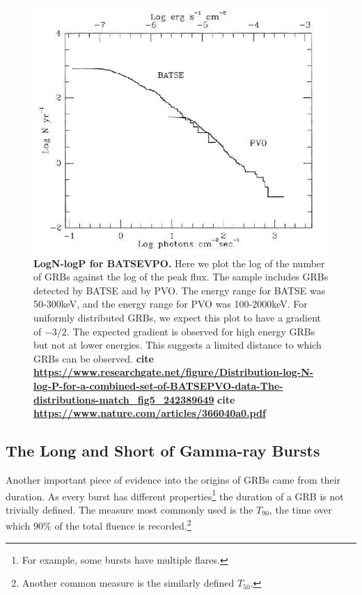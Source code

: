 \documentclass[11pt]{cuthesis}
\begin{document}
\begin{figure} %
\begin{center}
\includegraphics[width=0.8\linewidth]{logN-logP.png}
\end{center}
\caption{\textbf{LogN-logP for BATSEVPO.} Here we plot the log of the number of GRBs against the log of the peak flux. The sample includes GRBs detected by BATSE and by PVO. The energy range for BATSE was 50-300keV, and the energy range for PVO was 100-2000keV. For uniformly distributed GRBs, we expect this plot to have a gradient of $-3/2$. The expected gradient is observed for high energy GRBs but not at lower energies. This suggests a limited distance to which GRBs can be observed. 
\textbf{cite \url{https://www.researchgate.net/figure/Distribution-log-N-log-P-for-a-combined-set-of-BATSEPVO-data-The-distributions-match_fig5_242389649}}
\textbf{cite \url{https://www.nature.com/articles/366040a0.pdf}}
}
\label{fig:logn - logp}
\end{figure}

\subsection{The Long and Short of Gamma-ray Bursts}
Another important piece of evidence into the origins of GRBs came from their duration. As every burst has different properties\footnote{For example, some bursts have multiple flares.} the duration of a GRB is not trivially defined. The measure most commonly used is the $T_{90}$, the time over which $90\%$ of the total fluence is recorded.\footnote{Another common measure is the similarly defined $T_{50}$.} 
\end{document}
